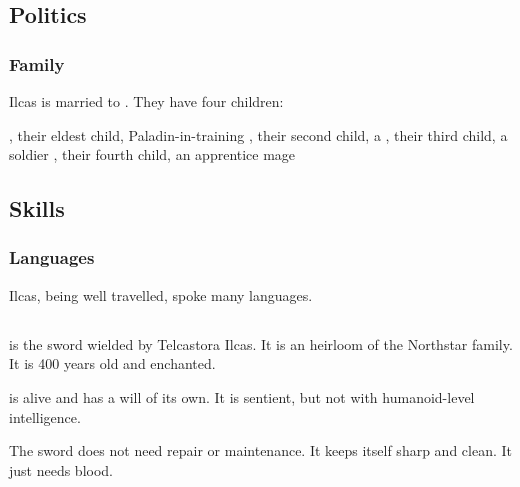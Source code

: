 \subsection{Politics}
\subsubsection{Family}
Ilcas is married to . 
They have four children: 

\begin{dramatispersonae}
  , 
    their eldest child, Paladin-in-training 
  , 
    their second child, a \nycaneer{}
  , 
    their third child, a soldier
  , 
    their fourth child, an apprentice mage
\end{dramatispersonae}









\subsection{Skills}





\subsubsection{Languages}
Ilcas, being well travelled, spoke many languages.









\subsection{\Telderain}
\index{\Telderain}
\Telderain{} is the sword wielded by Telcastora Ilcas. 
It is an heirloom of the Northstar family. 
It is 400 years old and enchanted. 

\Telderain{} is alive and has a will of its own. 
It is sentient, but not with humanoid-level intelligence. 

The sword does not need repair or maintenance. 
It keeps itself sharp and clean. 
It just needs blood. 

